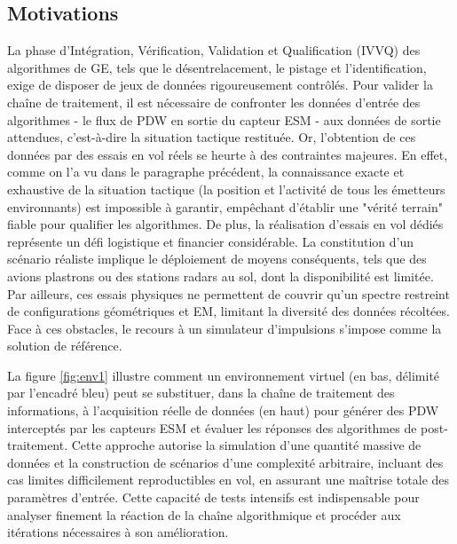 \subsection{Motivations}
La phase d'Intégration, Vérification, Validation et Qualification (IVVQ) des algorithmes de GE, tels que le désentrelacement, le pistage et l'identification, exige de disposer de jeux de données rigoureusement contrôlés. Pour valider la chaîne de traitement, il est nécessaire de confronter les données d'entrée des algorithmes - le flux de PDW en sortie du capteur ESM - aux données de sortie attendues, c'est-à-dire la situation tactique restituée. Or, l'obtention de ces données par des essais en vol réels se heurte à des contraintes majeures. En effet, comme on l'a vu dans le paragraphe précédent, la connaissance exacte et exhaustive de la situation tactique (la position et l'activité de tous les émetteurs environnants) est impossible à garantir, empêchant d'établir une "vérité terrain" fiable pour qualifier les algorithmes. De plus, la réalisation d'essais en vol dédiés représente un défi logistique et financier considérable. La constitution d'un scénario réaliste implique le déploiement de moyens conséquents, tels que des avions plastrons ou des stations radars au sol, dont la disponibilité est limitée. Par ailleurs, ces essais physiques ne permettent de couvrir qu'un spectre restreint de configurations géométriques et EM, limitant la diversité des données récoltées. Face à ces obstacles, le recours à un simulateur d'impulsions s'impose comme la solution de référence. 

La figure \ref{fig:env1} illustre comment un environnement virtuel (en bas, délimité par l'encadré bleu) peut se substituer, dans la chaîne de traitement des informations, à l'acquisition réelle de données (en haut) pour générer des PDW interceptés par les capteurs ESM et évaluer les réponses des algorithmes de post-traitement. Cette approche autorise la simulation d'une quantité massive de données et la construction de scénarios d'une complexité arbitraire, incluant des cas limites difficilement reproductibles en vol, en assurant une maîtrise totale des paramètres d'entrée. Cette capacité de tests intensifs est indispensable pour analyser finement la réaction de la chaîne algorithmique et procéder aux itérations nécessaires à son amélioration.

